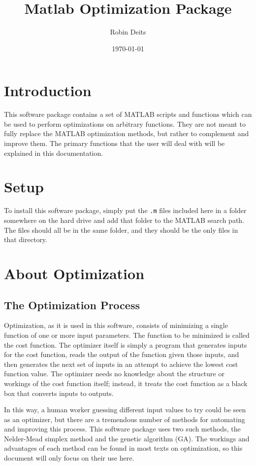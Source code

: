 \documentclass[]{article}
\begin{document}
\title{Matlab Optimization Package}
\author{Robin Deits}
\date{\today}
\maketitle
\tableofcontents
\section{Introduction}
This software package contains a set of MATLAB scripts and functions which can be used to perform optimizations on arbitrary functions. They are not meant to fully replace the MATLAB optimization methods, but rather to complement and improve them. The primary functions that the user will deal with will be explained in this documentation.
\section{Setup}
To install this software package, simply put the \texttt{.m} files included here in a folder somewhere on the hard drive and add that folder to the MATLAB search path. The files should all be in the same folder, and they should be the only files in that directory. 
\section{About Optimization}
\subsection{The Optimization Process}
Optimization, as it is used in this software, consists of minimizing a single function of one or more input parameters. The function to be minimized is called the cost function. The optimizer itself is simply a program that generates inputs for the cost function, reads the output of the function given those inputs, and then generates the next set of inputs in an attempt to achieve the lowest cost function value. The optimizer needs no knowledge about the structure or workings of the cost function itself; instead, it treats the cost function as a black box that converts inputs to outputs.

In this way, a human worker guessing different input values to try could be seen as an optimizer, but there are a tremendous number of methods for automating and improving this process. This software package uses two such methods, the Nelder-Mead simplex method and the genetic algorithm (GA). The workings and advantages of each method can be found in most texts on optimization, so this document will only focus on their use here.
\end{document}
